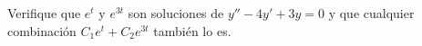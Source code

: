 Verifique que $e^t$ y $e^{3t}$ son soluciones de $y''-4y'+3y=0$ y que cualquier combinación $C_1e^t+C_2e^{3t}$ también lo es.
